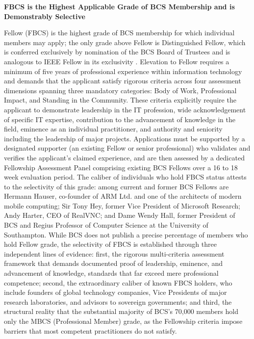 \textbf{FBCS is the Highest Applicable Grade of BCS Membership and is Demonstrably Selective}

Fellow (FBCS) is the highest grade of BCS membership for which individual members may apply; the only grade above Fellow is Distinguished Fellow, which is conferred exclusively by nomination of the BCS Board of Trustees and is analogous to IEEE Fellow in its exclusivity \cite{bcsfellowguidance}. Elevation to Fellow requires a minimum of five years of professional experience within information technology and demands that the applicant satisfy rigorous criteria across four assessment dimensions spanning three mandatory categories: Body of Work, Professional Impact, and Standing in the Community. These criteria explicitly require the applicant to demonstrate leadership in the IT profession, wide acknowledgement of specific IT expertise, contribution to the advancement of knowledge in the field, eminence as an individual practitioner, and authority and seniority including the leadership of major projects. Applications must be supported by a designated supporter (an existing Fellow or senior professional) who validates and verifies the applicant's claimed experience, and are then assessed by a dedicated Fellowship Assessment Panel comprising existing BCS Fellows over a 16 to 18 week evaluation period. The caliber of individuals who hold FBCS status attests to the selectivity of this grade: among current and former BCS Fellows are Hermann Hauser, co-founder of ARM Ltd. and one of the architects of modern mobile computing; Sir Tony Hey, former Vice President of Microsoft Research; Andy Harter, CEO of RealVNC; and Dame Wendy Hall, former President of BCS and Regius Professor of Computer Science at the University of Southampton. While BCS does not publish a precise percentage of members who hold Fellow grade, the selectivity of FBCS is established through three independent lines of evidence: first, the rigorous multi-criteria assessment framework that demands documented proof of leadership, eminence, and advancement of knowledge, standards that far exceed mere professional competence; second, the extraordinary caliber of known FBCS holders, who include founders of global technology companies, Vice Presidents of major research laboratories, and advisors to sovereign governments; and third, the structural reality that the substantial majority of BCS's 70,000 members hold only the MBCS (Professional Member) grade, as the Fellowship criteria impose barriers that most competent practitioners do not satisfy.

